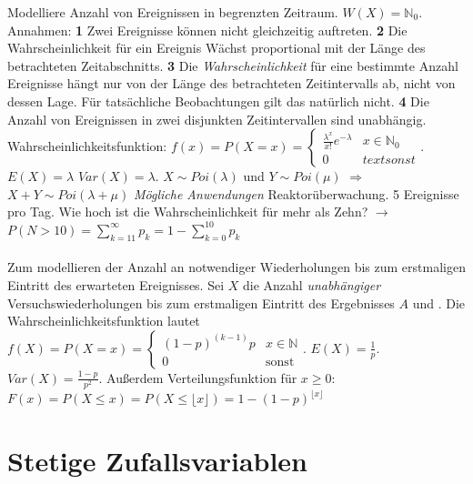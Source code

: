  Modelliere Anzahl von Ereignissen in begrenzten Zeitraum. $W(X) = \mathds{N}_0$. Annahmen: \textbf{1} Zwei Ereignisse können nicht gleichzeitig auftreten. \textbf{2} Die Wahrscheinlichkeit für ein Ereignis Wächst proportional mit der Länge des betrachteten Zeitabschnitts. \textbf{3} Die \emph{Wahrscheinlichkeit} für eine bestimmte Anzahl Ereignisse hängt nur von der Länge des betrachteten Zeitintervalls ab, nicht von dessen Lage. Für tatsächliche Beobachtungen gilt das natürlich nicht. \textbf{4} Die Anzahl von Ereignissen in zwei disjunkten Zeitintervallen sind unabhängig. Wahrscheinlichkeitsfunktion: $f(x) = P(X=x) = \begin{cases}
    \frac{\lambda^x}{x!}e^{-\lambda} & x \in \mathds{N}_0\\
    0 & text{sonst}
\end{cases}$. $E(X) = \lambda$ $Var(X) = \lambda$. $X \sim Poi(\lambda)$ und $Y \sim Poi(\mu)$ $\Rightarrow$ $X + Y \sim Poi(\lambda + \mu)$ \emph{Mögliche Anwendungen} Reaktorüberwachung. 5 Ereignisse pro Tag. Wie hoch ist die Wahrscheinlichkeit für mehr als Zehn? $\rightarrow$ $P(N > 10) = \sum_{k=11}^\infty p_k = 1 - \sum_{k=0}^{10}p_k$ \\\\
 Zum modellieren der Anzahl an notwendiger Wiederholungen bis zum erstmaligen Eintritt des erwarteten Ereignisses. Sei $X$ die Anzahl \emph{unabhängiger} Versuchswiederholungen bis zum erstmaligen Eintritt des Ergebnisses $A$ und . Die Wahrscheinlichkeitsfunktion lautet $f(X) = P(X = x) = \begin{cases}
    (1 - p) ^ (k-1) p & x \in \mathds{N}\\
    0 & \text{sonst}
\end{cases}$. $E(X) = \frac{1}{p}$. $Var(X) = \frac{1-p}{p^2}$. Außerdem Verteilungsfunktion für $x \ge 0$: $F(x) = P(X \le x) = P(X \le \lfloor x\rfloor) = 1 - (1 - p)^{\lfloor x\rfloor}$



\section{Stetige Zufallsvariablen}
